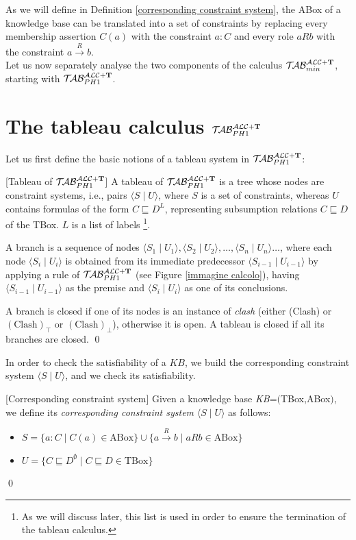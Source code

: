 \documentclass[a4paper, 11pt, oneside]{duthesis}
\newcommand{\tip}{{\bf T}}
\newcommand{\unione} {\cup}
\newcommand{\vuoto} {\emptyset}
\newcommand{\tc} {\mid}
\newcommand{\sx} {\langle}
\newcommand{\dx} {\rangle}
\newcommand{\nuovoc}{\mathrel{{\mathcal{T}\!\mathcal{AB}}}_{min}^{\mathcal{ALC}+\mbox{\scriptsize $\tip$}}}
\newcommand{\primo}{\mathrel{{\mathcal{T}\!\mathcal{AB}}}_{PH 1}^{\mathcal{ALC}+\mbox{\scriptsize $\tip$}}}
\newcommand{\trans}[1]{\stackrel{#1}{\longrightarrow}}
\newenvironment{definition}
{\begin{defi} \rm}{\qed \end{defi}}
\newenvironment{definition}
{\begin{defi} \rm}{\qed \end{defi}}
\newtheorem{definition}{Definition}
\newcounter{posu}
\newtheorem{definition}[posu]{Definition}
\begin{document}
As we will define in Definition \ref{corresponding constraint system}, the ABox of a knowledge base can be translated into a set of constraints by replacing every membership assertion $C(a)$ with the constraint $a: C$ and every role $a R b$ with the constraint $a \trans{R} b$.\\

Let us now separately analyse the two components of the calculus $\nuovoc$, starting with $\primo$.

\section{The tableau calculus $\primo$}\label{tableau_ph1}

Let us first define the basic notions of a tableau system in $\primo$:


\begin{definition}[Tableau of $\primo$]\label{deftableau}
A tableau of $\primo$ is a tree whose nodes are constraint systems, i.e., pairs $\sx S \tc U \dx$, where $S$ is a set of constraints, whereas $U$ contains formulas of the form $C \sqsubseteq D^L$, representing subsumption relations $C \sqsubseteq D$ of the TBox. $L$ is a list of labels
\footnote{As we will discuss later, this list is used in order to ensure the termination of the tableau calculus.}.

A branch is a sequence of nodes $\sx S_1 \tc U_1 \dx, \sx S_2 \tc U_2 \dx, \dots, \sx S_n  \tc U_n \dx \dots$, where each node $\sx S_i \tc U_i \dx$ is obtained from its immediate predecessor $\sx S_{i-1} \tc U_{i-1} \dx$ by applying a rule of $\primo$ (see Figure \ref{immagine calcolo}), having $\sx S_{i-1} \tc U_{i-1} \dx$ as the premise and $\sx S_{i} \tc U_{i} \dx$ as one of its conclusions.

A branch is closed if one of its nodes is an instance of \emph{clash} (either (Clash) or $(\mbox{Clash})_\top$ or $(\mbox{Clash})_\bot$), otherwise it is open. A tableau is closed if all its branches are closed.
\end{definition}

\noindent In order to check the satisfiability of a $KB$, we build the corresponding constraint system $\sx S \tc U \dx$, and we check its satisfiability.

\begin{definition}[Corresponding constraint system]\label{corresponding constraint system}
Given a knowledge base \emph{KB}=$($TBox,ABox$)$, we define its \emph{corresponding constraint system} $\sx S \tc U \dx$ as follows:

\begin{itemize}
 \item $S=\{a: C \tc C(a) \in \mbox{ABox}\} \unione \{a \trans{R} b \tc a R b \in \mbox{ABox}\}$
 \item $U=\{C \sqsubseteq D^{\vuoto} \tc C \sqsubseteq D \in \mbox{TBox}\}$
\end{itemize}

\end{definition}
\end{document}
